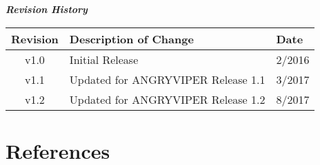 \maketitle
\thispagestyle{fancy}
\newpage

	\begin{center}
	\textit{\textbf{Revision History}}
		\begin{table}[H] %
		\label{table:revisions}
		\centering
			\begin{tabularx}{.7\textwidth}{|c|X|l|}
			\hline
			\rowcolor{blue}
			\textbf{Revision} & \textbf{Description of Change} & \textbf{Date} \\
		    \hline
			v1.0 & Initial Release & 2/2016 \\
		    \hline
			v1.1 & Updated for ANGRYVIPER Release 1.1 & 3/2017 \\
			\hline
			v1.2 & Updated for ANGRYVIPER Release 1.2 & 8/2017 \\
			\hline
			\end{tabularx}
		\end{table}
	\end{center}

\newpage

\tableofcontents

\newpage


\listoftables

\newpage

\section{References}

